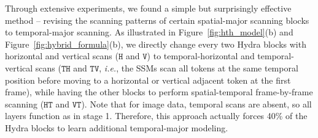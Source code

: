 Through extensive experiments, we found a simple but surprisingly effective method -- revising the scanning patterns of certain spatial-major scanning blocks to temporal-major scanning. As illustrated in Figure~\ref{fig:hth_model}(b) and Figure~\ref{fig:hybrid_formula}(b), we directly change every two Hydra blocks with horizontal and vertical scans ($\texttt{H}$ and $\texttt{V}$) to temporal-horizontal and temporal-vertical scans ($\texttt{TH}$ and $\texttt{TV}$, \textit{i.e.}, the SSMs scan all tokens at the same temporal position before moving to a horizontal or vertical adjacent token at the first frame), while having the other blocks to perform spatial-temporal frame-by-frame scanning ($\texttt{HT}$ and $\texttt{VT}$). Note that for image data, temporal scans are absent, so all layers function as in stage 1. Therefore, this approach actually forces 40\% of the Hydra blocks to learn additional temporal-major modeling.

